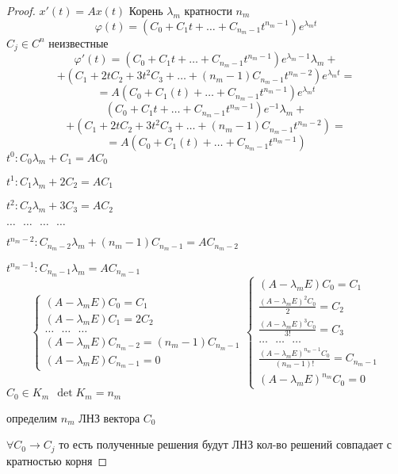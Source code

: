 \begin{proof}
  $x'(t) = Ax(t)$ Корень $\lambda_m$ кратности $n_m$
  $$
  \varphi(t) = (C_0 + C_1 t + \ldots + C_{n_m-1}t^{n_m-1})e^{\lambda_m t}
  $$
  $C_j \in C^n$ неизвестные
  $$
  \varphi'(t) = (C_0 + C_1 t + \ldots + C_{n_m-1}t^{n_m-1})e^{\lambda_m - 1}
  \lambda_m +
  $$
  $$
  + (C_1 + 2tC_2 + 3t^2C_3 + \ldots + (n_m-1)C_{n_m-1}t^{n_m-2})
  e^{\lambda_m t} =
  $$
  $$
  = A(C_0 + C_1(t) + \ldots + C_{n_m-1}t^{n_m-1}) e^{\lambda_m t}
  $$
  $$
 (C_0 + C_1 t + \ldots + C_{n_m-1}t^{n_m-1})e^{-1}\lambda_m +
  $$
  $$
  + (C_1 + 2tC_2 + 3t^2C_3 + \ldots + (n_m-1)C_{n_m-1}t^{n_m-2}) =
  $$
  $$
  = A(C_0 + C_1(t) + \ldots + C_{n_m-1}t^{n_m-1})
  $$
  $t^0 : C_0 \lambda_m + C_1 = AC_0$

  $t^1 : C_1 \lambda_m + 2C_2 = AC_1$

  $t^2 : C_2 \lambda_m + 3C_3 = AC_2$

  $\ldots ~~~ \ldots ~~~ \ldots ~~~ \ldots$

  $t^{n_m-2} : C_{n_m-2} \lambda_m + (n_m - 1)C_{n_m - 1} = AC_{n_m - 2}$

  $t^{n_m-1} : C_{n_m-1} \lambda_m = AC_{n_m - 1}$
  $$
  \left\{
  \begin{array}{l}
    (A - \lambda_mE) C_0 = C_1 \\
    (A - \lambda_mE) C_1 = 2C_2 \\
    \ldots ~~~ \ldots ~~~ \ldots \\
    (A - \lambda_mE) C_{n_m-2} = (n_m-1)C_{n_m-1} \\
    (A - \lambda_mE) C_{n_m-1} = 0
  \end{array}
  \right.
  \left\{
  \begin{array}{l}
    (A - \lambda_mE) C_0 = C_1 \\
    \frac{(A - \lambda_mE)^2 C_0}{2} = C_2 \\
    \frac{(A - \lambda_mE)^3 C_0}{3!} = C_3 \\
    \ldots ~~~ \ldots ~~~ \ldots \\
    \frac{(A - \lambda_mE)^{n_m-1} C_0}{(n_m-1)!} = C_{n_m-1} \\
    (A - \lambda_mE)^{n_m}C_0 = 0
  \end{array}
  \right.
  $$
  $C_0 \in K_m ~~ \det K_m = n_m$

  определим $n_m$ ЛНЗ вектора $C_0$

  $\forall C_0 \to C_j$ то есть полученные решения будут ЛНЗ кол-во решений
  совпадает с кратностью корня
\end{proof}

